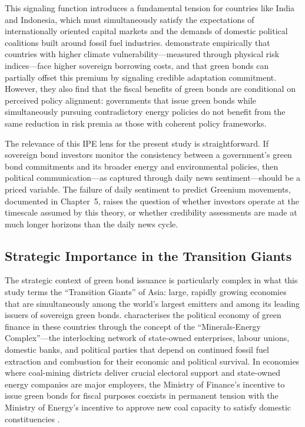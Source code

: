 \documentclass[12pt,a4paper]{article}
\begin{document}
This signaling function introduces a fundamental tension for countries like India and Indonesia, which must simultaneously satisfy the expectations of internationally oriented capital markets and the demands of domestic political coalitions built around fossil fuel industries. \citet{Kling2021} demonstrate empirically that countries with higher climate vulnerability---measured through physical risk indices---face higher sovereign borrowing costs, and that green bonds can partially offset this premium by signaling credible adaptation commitment. However, they also find that the fiscal benefits of green bonds are conditional on perceived policy alignment: governments that issue green bonds while simultaneously pursuing contradictory energy policies do not benefit from the same reduction in risk premia as those with coherent policy frameworks.

The relevance of this IPE lens for the present study is straightforward. If sovereign bond investors monitor the consistency between a government's green bond commitments and its broader energy and environmental policies, then political communication---as captured through daily news sentiment---should be a priced variable. The failure of daily sentiment to predict Greenium movements, documented in Chapter~5, raises the question of whether investors operate at the timescale assumed by this theory, or whether credibility assessments are made at much longer horizons than the daily news cycle.


\subsection{Strategic Importance in the Transition Giants}

The strategic context of green bond issuance is particularly complex in what this study terms the ``Transition Giants'' of Asia: large, rapidly growing economies that are simultaneously among the world's largest emitters and among its leading issuers of sovereign green bonds. \citet{Neumann2025} characterises the political economy of green finance in these countries through the concept of the ``Minerals-Energy Complex''---the interlocking network of state-owned enterprises, labour unions, domestic banks, and political parties that depend on continued fossil fuel extraction and combustion for their economic and political survival. In economies where coal-mining districts deliver crucial electoral support and state-owned energy companies are major employers, the Ministry of Finance's incentive to issue green bonds for fiscal purposes coexists in permanent tension with the Ministry of Energy's incentive to approve new coal capacity to satisfy domestic constituencies \citep{Neumann2025}.
\end{document}

